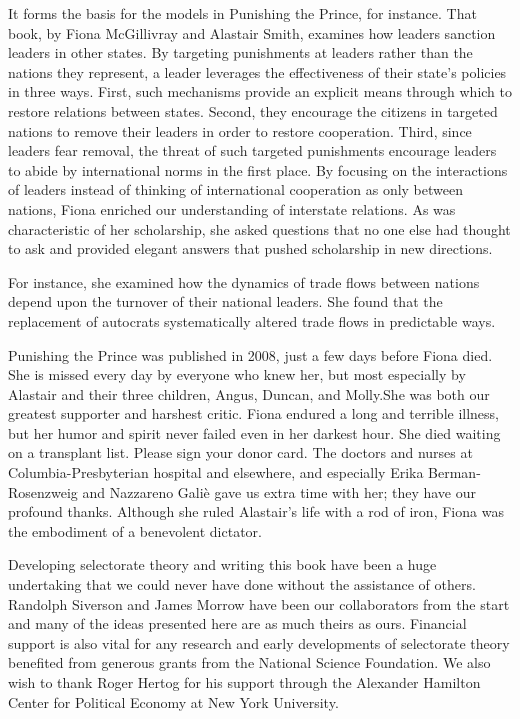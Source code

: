 \documentclass[10pt]{article}
\begin{document}
{\large It forms the basis for the models in Punishing the Prince, for instance.
That book, by Fiona McGillivray and Alastair Smith, examines how leaders sanction
leaders in other states. By targeting punishments at leaders rather than the
nations they represent, a leader leverages the effectiveness of their state's
policies in three ways. First, such mechanisms provide an explicit means through
which to restore relations between states. Second, they encourage the citizens in
targeted nations to remove their leaders in order to restore cooperation. Third,
since leaders fear removal, the threat of such targeted punishments encourage
leaders to abide by international norms in the first place. By focusing on the
interactions of leaders instead of thinking of international cooperation as only
between nations, Fiona enriched our understanding of interstate relations. As was
characteristic of her scholarship, she asked questions that no one else had
thought to ask and provided elegant answers that pushed scholarship in new
directions.}

{\large For instance, she examined how the dynamics of trade flows between
nations depend upon the turnover of their national leaders. She found that the
replacement of autocrats systematically altered trade flows in predictable ways.}

{\large Punishing the Prince was published in 2008, just a few days before Fiona
died. She is missed every day by everyone who knew her, but most especially by
Alastair and their three children, Angus, Duncan, and Molly.She was both our
greatest supporter and harshest critic. Fiona endured a long and terrible
illness, but her humor and spirit never failed even in her darkest hour. She died
waiting on a transplant list. Please sign your donor card. The doctors and nurses
at Columbia-Presbyterian hospital and elsewhere, and especially Erika
Berman-Rosenzweig and Nazzareno Gali\`{e} gave us extra time with her; they have
our profound thanks. Although she ruled Alastair's life with a rod of iron, Fiona
was the embodiment of a benevolent dictator.}

{\large Developing selectorate theory and writing this book have been a huge
undertaking that we could never have done without the assistance of others.
Randolph Siverson and James Morrow have been our collaborators from the start and
many of the ideas presented here are as much theirs as ours. Financial support is
also vital for any research and early developments of selectorate theory
benefited from generous grants from the National Science Foundation. We also wish
to thank Roger Hertog for his support through the Alexander Hamilton Center for
Political Economy at New York University.}
\end{document}

